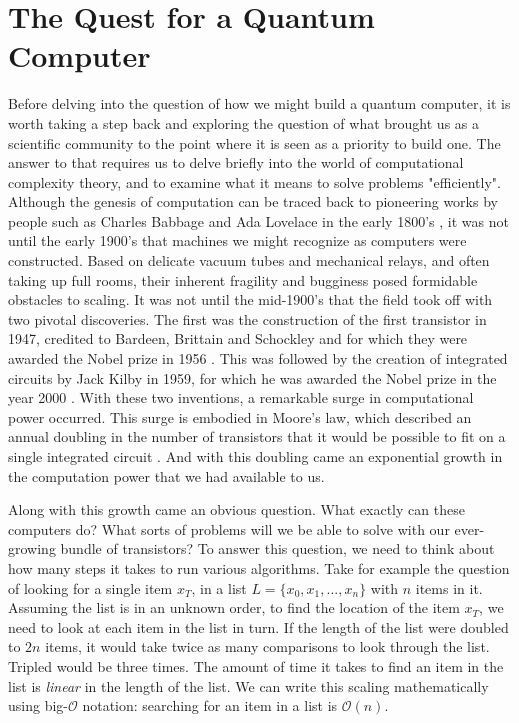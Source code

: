 \chapter{The Quest for a Quantum Computer}
Before delving into the question of how we might build a quantum computer, it is worth taking a step
back and exploring the question of what brought us as a scientific community to the point where
it is seen as a priority to build one. The answer to that requires us to delve briefly into
the world of computational complexity theory, and to examine what it means to solve problems "efficiently".
Although the genesis of computation can be traced back to pioneering works by people such as Charles Babbage
and Ada Lovelace in the early 1800's \cite{Bowden:1953:FTS:1102044}, it was not until the early 1900's that
machines we might recognize as computers were constructed. Based on delicate vacuum tubes and mechanical relays,
and often taking up full rooms, their inherent fragility and bugginess posed formidable obstacles to scaling.
It was not until the mid-1900's that the field took off with two pivotal discoveries. The first
was the construction of the first transistor in 1947, credited to Bardeen, Brittain and Schockley and for which
they were awarded the Nobel prize in 1956 \cite{nobel1956}. This was followed by the creation of integrated circuits by Jack Kilby
in 1959, for which he was awarded the Nobel prize in the year 2000 \cite{nobel2000}. With these two inventions, a remarkable
surge in computational power occurred. This surge is embodied in Moore's law, which described an annual
doubling in the number of transistors that it would be possible to fit on a single integrated circuit \cite{4785860}.
And with this doubling came an exponential growth in the computation power that we had available to us.

Along with this growth came an obvious question. What exactly can these computers do? What sorts of
problems will we be able to solve with our ever-growing bundle of transistors? To answer this question, we need to
think about how many steps it takes to run various algorithms. Take for example the question of looking
for a single item $x_T$, in a list $L = \{x_0, x_1, ..., x_n\}$ with $n$ items in it. Assuming the list
is in an unknown order, to find the location of the item $x_T$, we need to look at each item in the list
in turn. If the length of the list were doubled to $2n$ items, it would take twice as many comparisons to
look through the list. Tripled would be three times. The amount of time it takes to find an item in the
list is \emph{linear} in the length of the list. We can write this scaling mathematically using big-$\mathcal{O}$
notation: searching for an item in a list is $\mathcal{O}(n)$.

